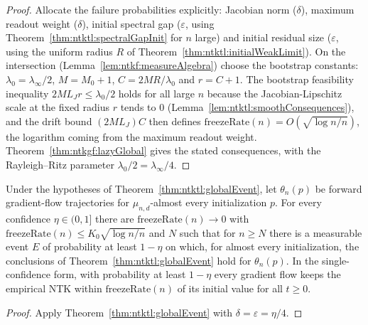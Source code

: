 \begin{proof}
  \leanok
Allocate the failure probabilities explicitly: Jacobian norm ($\delta$), maximum readout weight ($\delta$), initial spectral gap ($\varepsilon$, using Theorem~\ref{thm:ntktl:spectralGapInit} for $n$ large) and initial residual size ($\varepsilon$, using the uniform radius $R$ of
Theorem~\ref{thm:ntktl:initialWeakLimit}). On the intersection (Lemma~\ref{lem:ntkf:measureAlgebra}) choose the bootstrap constants: $\lambda_0=\lambda_\infty/2$, $M=M_0+1$, $C=2M R/\lambda_0$ and $r=C+1$. The bootstrap feasibility inequality $2ML_Jr\le\lambda_0/2$ holds for all large $n$ because the Jacobian-Lipschitz scale at the fixed
radius $r$ tends to $0$ (Lemma~\ref{lem:ntktl:smoothConsequences}), and the drift bound $(2ML_J)C$ then defines $\mathrm{freezeRate}(n)=O(\sqrt{\log n/n})$, the logarithm coming from the maximum readout weight. Theorem~\ref{thm:ntkgf:lazyGlobal} gives the stated consequences, with the Rayleigh--Ritz parameter
$\lambda_0/2=\lambda_\infty/4$.
\end{proof}

\begin{theorem}\label{thm:ntktl:globalLimit}
  \leanok
Under the hypotheses of Theorem~\ref{thm:ntktl:globalEvent}, let $\theta_n(p)$ be forward gradient-flow trajectories for $\mu_{n,d}$-almost every initialization $p$. For every confidence $\eta\in(0,1]$ there are $\mathrm{freezeRate}(n)\to0$ with
$\mathrm{freezeRate}(n)\le K_0\sqrt{\log n/n}$ and $N$ such that for $n\ge N$ there is a measurable event $E$ of probability at least $1-\eta$ on which, for almost every initialization, the conclusions of Theorem~\ref{thm:ntktl:globalEvent} hold for $\theta_n(p)$. In the single-confidence form, with probability at least $1-\eta$ every gradient flow keeps the empirical NTK within
$\mathrm{freezeRate}(n)$ of its initial value for all $t\ge0$.
\end{theorem}

\begin{proof}
  \leanok
Apply Theorem~\ref{thm:ntktl:globalEvent} with $\delta=\varepsilon=\eta/4$.
\end{proof}

